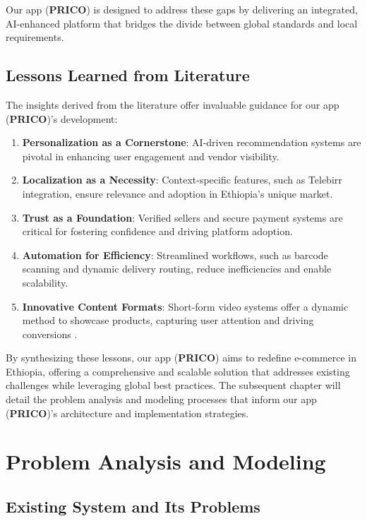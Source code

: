 \documentclass[12pt]{report}
\begin{document}
Our app (\textbf{PRICO}) is designed to address these gaps by delivering an integrated, AI-enhanced
platform that bridges the divide between global standards and local requirements.

\section{Lessons Learned from Literature}

The insights derived from the literature offer invaluable guidance for our app (\textbf{PRICO})’s
development:

\begin{enumerate}

	\item \textbf{Personalization as a Cornerstone}: AI-driven recommendation systems are pivotal in
	      enhancing user engagement and vendor visibility.
	\item \textbf{Localization as a Necessity}: Context-specific features, such as Telebirr integration,
	      ensure relevance and adoption in Ethiopia’s unique market.
	\item \textbf{Trust as a Foundation}: Verified sellers and secure payment systems are critical for
	      fostering confidence and driving platform adoption.
	\item \textbf{Automation for Efficiency}: Streamlined workflows, such as barcode scanning and
	      dynamic delivery routing, reduce inefficiencies and enable scalability.
	\item \textbf{Innovative Content Formats}: Short-form video systems offer a dynamic method to
	      showcase products, capturing user attention and driving conversions \cite{c19}.

\end{enumerate}

By synthesizing these lessons, our app (\textbf{PRICO}) aims to redefine e-commerce in Ethiopia,
offering a comprehensive and scalable solution that addresses existing challenges while
leveraging global best practices. The subsequent chapter will detail the problem analysis and
modeling processes that inform our app (\textbf{PRICO})’s architecture and implementation
strategies.

\chapter{Problem Analysis and Modeling}

\section{Existing System and Its Problems}
\end{document}
